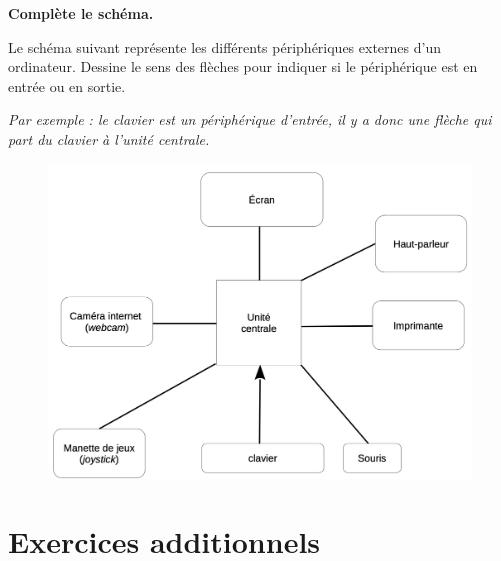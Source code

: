 \documentclass[11pt, a4paper]{book}
\begin{document}
\begin{exercice}
{\bf Complète le schéma.}

Le schéma suivant représente les différents périphériques externes d’un ordinateur. Dessine le sens des flèches pour indiquer si le périphérique est en entrée ou en sortie.

{\it Par exemple : le clavier est un périphérique d’entrée, il y a donc une flèche qui part du clavier à l’unité centrale.}

\begin{figure}[h!]
\centering
	\includegraphics[width=12cm]{images/ordinateur_ex_3}
\end{figure}
\end{exercice}


\section{Exercices additionnels}

\end{document}

